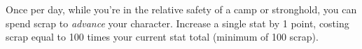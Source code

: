 
Once per day, while you're in the relative safety of a camp or stronghold, you can spend scrap to \emph{advance} your character. Increase a single stat by 1 point, costing scrap equal to 100 times your current stat total (minimum of 100 scrap).